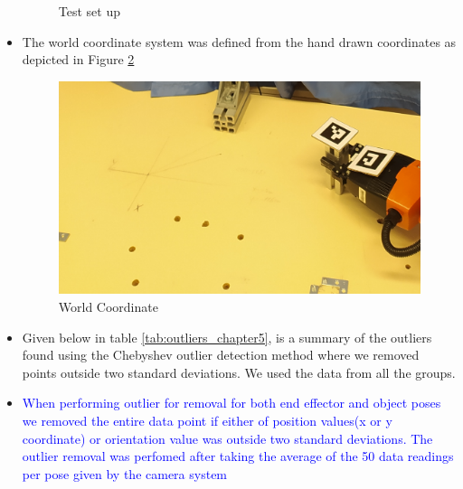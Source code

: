 \begin{itemize}
\begin{figure}[H]
            \caption{{Test set up}}
            \label{fig:exp05-test-set-up}
        \end{figure}
        \item The world coordinate system was defined from the hand drawn coordinates as depicted in Figure \ref{fig:exp05-coordinate-world}
        
        
        \begin{figure}[H] 
            \centering \includegraphics[width=\textwidth]{"images/experiment_5/Coordinate_system.png"}
            \caption{{World Coordinate}}
            \label{fig:exp05-coordinate-world}
        \end{figure}
        
        
           
        \item Given below in table \ref{tab:outliers_chapter5}, is a summary of the outliers found using the Chebyshev outlier detection method where we removed points outside two standard deviations. We used the data from all the groups.
        \item \textcolor{blue}{When performing outlier for removal for both end effector and object poses we removed the entire data point if either of position values(x or y coordinate) or orientation value was outside two standard deviations. The outlier removal was perfomed after taking the average of the 50 data readings per pose given by the camera system} 
    \end{itemize}

